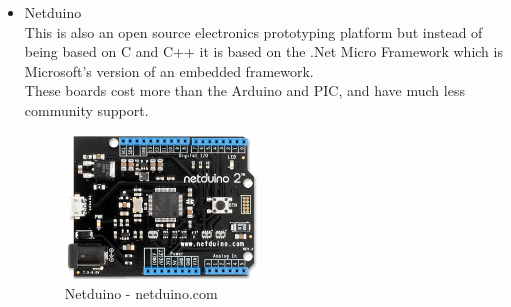 \begin{itemize}
\item Netduino
\\This is also an open source electronics prototyping platform but instead of being based on C and C++ it is based on the .Net Micro Framework which is Microsoft's version of an embedded framework.
\\These boards cost more than the Arduino and PIC, and have much less community support.
\begin{figure}[h]
\centering
        \includegraphics[width=2.0in] {Images/netduino.png}
        \caption{Netduino - netduino.com}
        \label{Netduino}
\end{figure}


\end{itemize}

